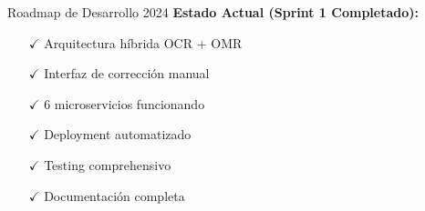 \documentclass[aspectratio=169,11pt]{beamer}
\begin{document}
\begin{frame}{Roadmap de Desarrollo 2024}
    \vspace{0.8cm}
    \textbf{\textcolor{jazzgreen}{Estado Actual (Sprint 1 Completado):}}
    \begin{multicols}{2}
        \begin{itemize}
            \item[$\checkmark$] Arquitectura híbrida OCR + OMR
            \item[$\checkmark$] Interfaz de corrección manual
            \item[$\checkmark$] 6 microservicios funcionando
            \item[$\checkmark$] Deployment automatizado
            \item[$\checkmark$] Testing comprehensivo
            \item[$\checkmark$] Documentación completa
        \end{itemize}
    \end{multicols}
\end{frame}
\end{document}
